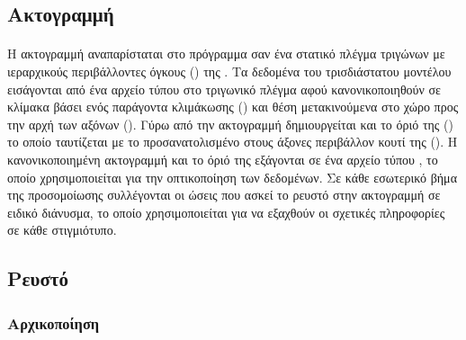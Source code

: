 \subsection{Ακτογραμμή}
\paragraph{} Η ακτογραμμή αναπαρίσταται στο πρόγραμμα σαν ένα στατικό πλέγμα τριγώνων με
ιεραρχικούς περιβάλλοντες όγκους () της . Τα δεδομένα
του τρισδιάστατου μοντέλου εισάγονται από ένα αρχείο τύπου  στο τριγωνικό πλέγμα
αφού κανονικοποιηθούν σε κλίμακα βάσει ενός παράγοντα κλιμάκωσης ()
και θέση μετακινούμενα στο χώρο προς την αρχή των αξόνων (). Γύρω από την
ακτογραμμή δημιουργείται και το όριό της () το οποίο ταυτίζεται με
το προσανατολισμένο στους άξονες περιβάλλον κουτί της (). Η κανονικοποιημένη
ακτογραμμή και το όριό της εξάγονται σε ένα αρχείο τύπου , το οποίο
χρησιμοποιείται για την οπτικοποίηση των δεδομένων. Σε κάθε εσωτερικό βήμα της
προσομοίωσης συλλέγονται οι ώσεις που ασκεί το ρευστό στην ακτογραμμή σε ειδικό διάνυσμα,
το οποίο χρησιμοποιείται για να εξαχθούν οι σχετικές πληροφορίες σε κάθε στιγμιότυπο.

\subsection{Ρευστό}
\subsubsection{Αρχικοποίηση}
\label{sssec:fluid-init}
